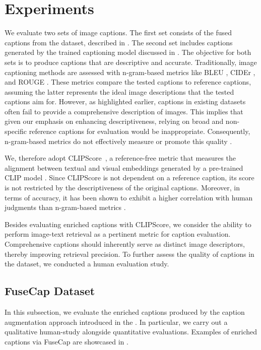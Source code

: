 \section{Experiments}\label{Se:experiments}
We evaluate two sets of image captions.
The first set consists of the fused captions from the \fusecap{} dataset, described in . The second set includes captions generated by the trained captioning model discussed in . 
The objective for both sets is to produce captions that are descriptive and accurate.
Traditionally, image captioning methods are assessed with n-gram-based metrics like BLEU \cite{papineni2002bleu}, CIDEr \cite{vedantam2015cider}, and ROUGE \cite{lin2004rouge}. 
These metrics compare the tested captions to reference captions, assuming the latter represents the ideal image descriptions that the tested captions aim for.
However, as highlighted earlier, captions in existing datasets often fail to provide a comprehensive description of images.
This implies that given our emphasis on enhancing descriptiveness, relying on broad and non-specific reference captions for evaluation would be inappropriate.
Consequently, n-gram-based metrics do not effectively measure or promote this quality \cite{zhu2023chatgpt}. 

We, therefore adopt CLIPScore~\cite{hessel2022clipscore}, a reference-free metric that measures the alignment between textual and visual embeddings generated by a pre-trained CLIP model \cite{radford2021learning}.
Since CLIPScore is not dependent on a reference caption, its score is not restricted by the descriptiveness of the original captions.
Moreover, in terms of accuracy, it has been shown to exhibit a higher correlation with human judgments than n-gram-based metrics \cite{hessel2022clipscore}.


Besides evaluating enriched captions with CLIPScore, we consider the ability to perform image-text retrieval as a pertinent metric for caption evaluation.
Comprehensive captions should inherently serve as distinct image descriptors, thereby improving retrieval precision.
To further assess the quality of captions in the \fusecap{} dataset, we conducted a human evaluation study.


\subsection{FuseCap Dataset}
\label{Se:data-validation}
In this subsection, we evaluate the enriched captions produced by the caption augmentation approach introduced in the .
In particular, we carry out a qualitative human-study alongside quantitative evaluations.
Examples of enriched captions via FuseCap are showcased in .
\vspace{-20pt}



